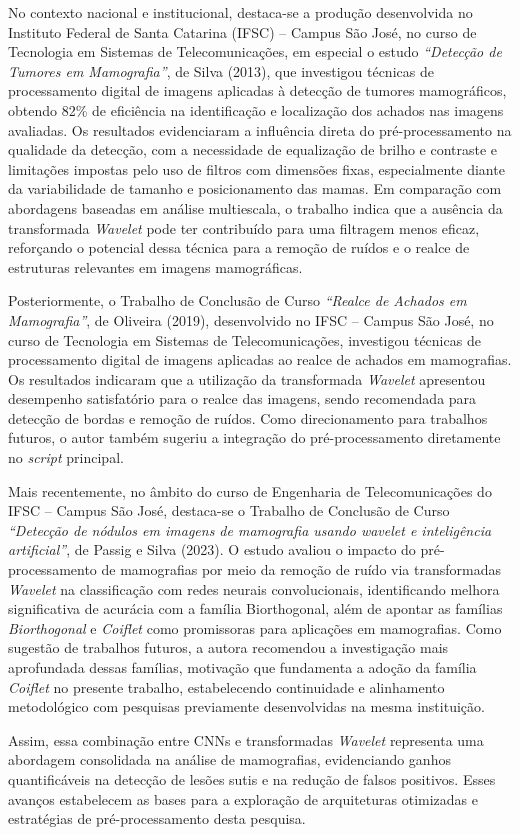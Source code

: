 No contexto nacional e institucional, destaca-se a produção desenvolvida no
Instituto Federal de Santa Catarina (IFSC) -- Campus São José, no curso de
Tecnologia em Sistemas de Telecomunicações, em especial o estudo
\textit{``Detecção de Tumores em Mamografia''}, de Silva (2013), que investigou
técnicas de processamento digital de imagens aplicadas à detecção de tumores
mamográficos, obtendo 82\% de eficiência na identificação e localização dos
achados nas imagens avaliadas. Os resultados evidenciaram a influência direta do
pré-processamento na qualidade da detecção, com a necessidade de equalização de
brilho e contraste e limitações impostas pelo uso de filtros com dimensões
fixas, especialmente diante da variabilidade de tamanho e posicionamento das
mamas. Em comparação com abordagens baseadas em análise multiescala, o trabalho
indica que a ausência da transformada \textit{Wavelet} pode ter contribuído para uma
filtragem menos eficaz, reforçando o potencial dessa técnica para a remoção de
ruídos e o realce de estruturas relevantes em imagens mamográficas.

Posteriormente, o Trabalho de Conclusão de Curso
\textit{``Realce de Achados em Mamografia''}, de Oliveira (2019), desenvolvido no
IFSC -- Campus São José, no curso de Tecnologia em Sistemas de Telecomunicações,
investigou técnicas de processamento digital de imagens aplicadas ao realce de
achados em mamografias. Os resultados indicaram que a utilização da transformada
\textit{Wavelet} apresentou desempenho satisfatório para o realce das imagens, sendo
recomendada para detecção de bordas e remoção de ruídos. Como direcionamento
para trabalhos futuros, o autor também sugeriu a integração do pré-processamento
diretamente no \textit{script} principal.

Mais recentemente, no âmbito do curso de Engenharia de Telecomunicações do
IFSC -- Campus São José, destaca-se o Trabalho de Conclusão de Curso
\textit{``Detecção de nódulos em imagens de mamografia usando wavelet e
inteligência artificial''}, de Passig e Silva (2023). O estudo avaliou
o impacto do pré-processamento de mamografias por meio da remoção de ruído via
transformadas \textit{Wavelet} na classificação com redes neurais convolucionais,
identificando melhora significativa de acurácia com a família Biorthogonal,
além de apontar as famílias \textit{Biorthogonal} e \textit{Coiflet} como promissoras para
aplicações em mamografias. Como sugestão de trabalhos futuros, a autora
recomendou a investigação mais aprofundada dessas famílias, motivação que
fundamenta a adoção da família \textit{Coiflet} no presente trabalho, estabelecendo
continuidade e alinhamento metodológico com pesquisas previamente desenvolvidas
na mesma instituição.

Assim, essa combinação entre CNNs e transformadas \textit{Wavelet} representa uma abordagem consolidada na análise de mamografias, evidenciando ganhos quantificáveis na detecção de lesões sutis e na redução de falsos positivos. Esses avanços estabelecem as bases para a exploração de arquiteturas otimizadas e estratégias de pré-processamento desta pesquisa.

